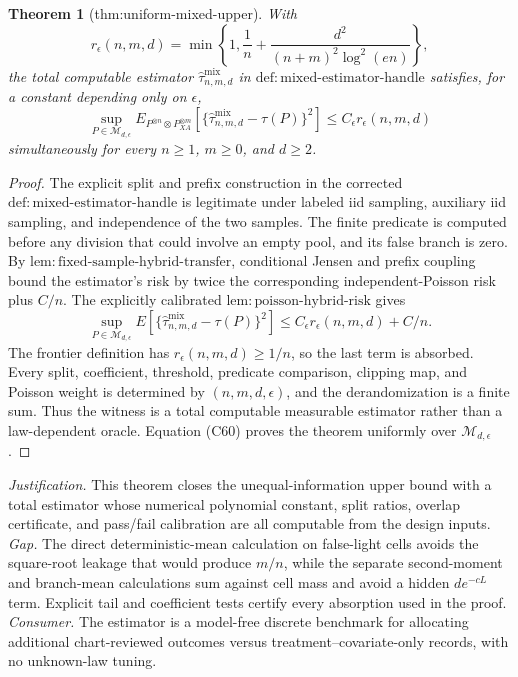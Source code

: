 \documentclass{article}
\newtheorem{theorem}{Theorem}
\begin{document}
\begin{theorem}[thm:uniform-mixed-upper]\label{thm:uniform-mixed-upper}
With
\[
 r_\epsilon(n,m,d)=\min\!\left\{1,\frac1n+\frac{d^2}{(n+m)^2\log^2(en)}\right\},
\]
the total computable estimator \(\widehat\tau^{\mathrm{mix}}_{n,m,d}\) in \(\mathrm{def:mixed\mbox{-}estimator\mbox{-}handle}\) satisfies, for a constant depending only on \(\epsilon\),
\[
 \sup_{P\in\mathcal M_{d,\epsilon}}
 E_{P^{\otimes n}\otimes P_{XA}^{\otimes m}}
 [\{\widehat\tau^{\mathrm{mix}}_{n,m,d}-\tau(P)\}^2]
 \le C_\epsilon r_\epsilon(n,m,d)
\]
simultaneously for every \(n\ge1\), \(m\ge0\), and \(d\ge2\).
\end{theorem}
\begin{proof}
The explicit split and prefix construction in the corrected \(\mathrm{def:mixed\mbox{-}estimator\mbox{-}handle}\) is legitimate under labeled iid sampling, auxiliary iid sampling, and independence of the two samples.  The finite predicate is computed before any division that could involve an empty pool, and its false branch is zero.  By \(\mathrm{lem:fixed\mbox{-}sample\mbox{-}hybrid\mbox{-}transfer}\), conditional Jensen and prefix coupling bound the estimator's risk by twice the corresponding independent-Poisson risk plus \(C/n\).  The explicitly calibrated \(\mathrm{lem:poisson\mbox{-}hybrid\mbox{-}risk}\) gives
\[
 \sup_{P\in\mathcal M_{d,\epsilon}}
 E[\{\widehat\tau^{\mathrm{mix}}_{n,m,d}-\tau(P)\}^2]
 \le C_\epsilon r_\epsilon(n,m,d)+C/n.                            \tag{C60}
\]
The frontier definition has \(r_\epsilon(n,m,d)\ge1/n\), so the last term is absorbed.  Every split, coefficient, threshold, predicate comparison, clipping map, and Poisson weight is determined by \((n,m,d,\epsilon)\), and the derandomization is a finite sum.  Thus the witness is a total computable measurable estimator rather than a law-dependent oracle.  Equation (C60) proves the theorem uniformly over \(\mathcal M_{d,\epsilon}\).
\end{proof}
\par\smallskip\noindent \textit{Justification.} This theorem closes the unequal-information upper bound with a total estimator whose numerical polynomial constant, split ratios, overlap certificate, and pass/fail calibration are all computable from the design inputs. \textit{Gap.} The direct deterministic-mean calculation on false-light cells avoids the square-root leakage that would produce \(m/n\), while the separate second-moment and branch-mean calculations sum against cell mass and avoid a hidden \(d e^{-cL}\) term.  Explicit tail and coefficient tests certify every absorption used in the proof. \textit{Consumer.} The estimator is a model-free discrete benchmark for allocating additional chart-reviewed outcomes versus treatment--covariate-only records, with no unknown-law tuning.
\end{document}
